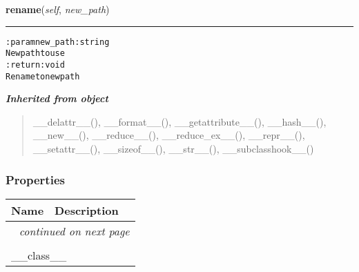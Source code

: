     \vspace{0.5ex}

\hspace{.8\funcindent}\begin{boxedminipage}{\funcwidth}

    \raggedright \textbf{rename}(\textit{self}, \textit{new\_path})

    \vspace{-1.5ex}

    \rule{\textwidth}{0.5\fboxrule}
\setlength{\parskip}{2ex}
\begin{alltt}

:param new\_path: string
    New path to use
:return: void
    Rename to new path
\end{alltt}

\setlength{\parskip}{1ex}
    \end{boxedminipage}


\large{\textbf{\textit{Inherited from object}}}

\begin{quote}
\_\_delattr\_\_(), \_\_format\_\_(), \_\_getattribute\_\_(), \_\_hash\_\_(), \_\_new\_\_(), \_\_reduce\_\_(), \_\_reduce\_ex\_\_(), \_\_repr\_\_(), \_\_setattr\_\_(), \_\_sizeof\_\_(), \_\_str\_\_(), \_\_subclasshook\_\_()
\end{quote}


  \subsubsection{Properties}

    \vspace{-1cm}
\hspace{\varindent}\begin{longtable}{|p{\varnamewidth}|p{\vardescrwidth}|l}
\cline{1-2}
\cline{1-2} \centering \textbf{Name} & \centering \textbf{Description}& \\
\cline{1-2}
\endhead\cline{1-2}\multicolumn{3}{r}{\small\textit{continued on next page}}\\\endfoot\cline{1-2}
\endlastfoot\multicolumn{2}{|l|}{\textit{Inherited from object}}\\
\multicolumn{2}{|p{\varwidth}|}{\raggedright \_\_class\_\_}\\
\cline{1-2}
\end{longtable}

